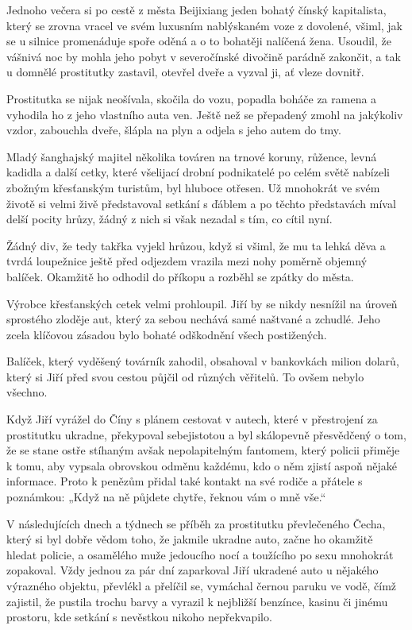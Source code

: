 Jednoho večera si po cestě z města Beijixiang jeden bohatý čínský kapitalista, který se zrovna vracel ve svém luxusním nablýskaném voze z dovolené, všiml, jak se u silnice promenáduje spoře oděná a o to bohatěji nalíčená žena. Usoudil, že vášnivá noc by mohla jeho pobyt v severočínské divočině parádně zakončit, a tak u domnělé prostitutky zastavil, otevřel dveře a vyzval ji, ať vleze dovnitř.

Prostitutka se nijak neošívala, skočila do vozu, popadla boháče za ramena a vyhodila ho z jeho vlastního auta ven. Ještě než se přepadený zmohl na jakýkoliv vzdor, zabouchla dveře, šlápla na plyn a odjela s jeho autem do tmy.

Mladý šanghajský majitel několika továren na trnové koruny, růžence, levná kadidla a další cetky, které všelijací drobní podnikatelé po celém světě nabízeli zbožným křesťanským turistům, byl hluboce otřesen. Už mnohokrát ve svém životě si velmi živě představoval setkání s ďáblem a po těchto představách míval delší pocity hrůzy, žádný z nich si však nezadal s tím, co cítil nyní.

Žádný div, že tedy takřka vyjekl hrůzou, když si všiml, že mu ta lehká děva a tvrdá loupežnice ještě před odjezdem vrazila mezi nohy poměrně objemný balíček.  Okamžitě ho odhodil do příkopu a rozběhl se zpátky do města. 
\vspace{0.75cm}

Výrobce křesťanských cetek velmi prohloupil. Jiří by se nikdy nesnížil na úroveň sprostého zloděje aut, který za sebou nechává samé naštvané a zchudlé. Jeho zcela klíčovou zásadou bylo bohaté odškodnění všech postižených.

Balíček, který vyděšený továrník zahodil, obsahoval v bankovkách milion dolarů, který si Jiří před svou cestou půjčil od různých věřitelů. To ovšem nebylo všechno. 

Když Jiří vyrážel do Číny s plánem cestovat v autech, které v přestrojení za prostitutku ukradne, překypoval sebejistotou a byl skálopevně přesvědčený o tom, že se stane ostře stíhaným avšak nepolapitelným fantomem, který policii přiměje k tomu, aby vypsala obrovskou odměnu každému, kdo o něm zjistí aspoň nějaké informace. Proto k penězům přidal také kontakt na své rodiče a přátele s poznámkou: „Když na ně půjdete chytře, řeknou vám o mně vše.“	
\vspace{0.75cm}

V následujících dnech a týdnech se příběh za prostitutku převlečeného Čecha, který si byl dobře vědom toho, že jakmile ukradne auto, začne ho okamžitě hledat policie, a osamělého muže jedoucího nocí a toužícího po sexu mnohokrát zopakoval.
Vždy jednou za pár dní zaparkoval Jiří ukradené auto u nějakého výrazného objektu, převlékl a přelíčil se, vymáchal černou paruku ve vodě, čímž zajistil, že pustila trochu barvy a vyrazil k nejbližší benzínce, kasinu či jinému prostoru, kde setkání s nevěstkou nikoho nepřekvapilo.

